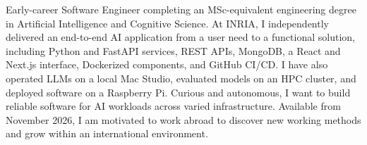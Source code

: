 
\begin{cvparagraph}
Early-career Software Engineer completing an MSc-equivalent engineering degree in Artificial Intelligence and Cognitive Science. At INRIA, I independently delivered an end-to-end AI application from a user need to a functional solution, including Python and FastAPI services, REST APIs, MongoDB, a React and Next.js interface, Dockerized components, and GitHub CI/CD. I have also operated LLMs on a local Mac Studio, evaluated models on an HPC cluster, and deployed software on a Raspberry Pi. Curious and autonomous, I want to build reliable software for AI workloads across varied infrastructure. Available from November 2026, I am motivated to work abroad to discover new working methods and grow within an international environment.
\end{cvparagraph}
